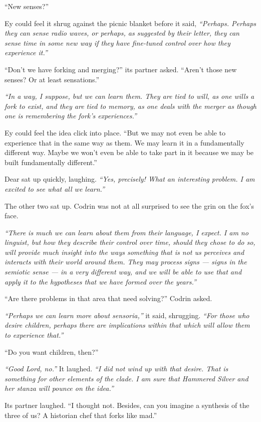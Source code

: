 ``New senses?''

Ey could feel it shrug against the picnic blanket before it said, \emph{``Perhaps. Perhaps they can sense radio waves, or perhaps, as suggested by their letter, they can sense time in some new way if they have fine-tuned control over how they experience it.''}

``Don't we have forking and merging?'' its partner asked. ``Aren't those new senses? Or at least sensations.''

\emph{``In a way, I suppose, but we can learn them. They are tied to will, as one wills a fork to exist, and they are tied to memory, as one deals with the merger as though one is remembering the fork's experiences.''}

Ey could feel the idea click into place. ``But we may not even be able to experience that in the same way as them. We may learn it in a fundamentally different way. Maybe we won't even be able to take part in it because we may be built fundamentally different.''

Dear sat up quickly, laughing. \emph{``Yes, precisely! What an interesting problem. I am excited to see what all we learn.''}

The other two sat up. Codrin was not at all surprised to see the grin on the fox's face.

\emph{``There is much we can learn about them from their language, I expect. I am no linguist, but how they describe their control over time, should they chose to do so, will provide much insight into the ways something that is not us perceives and interacts with their world around them. They may process signs — signs in the semiotic sense — in a very different way, and we will be able to use that and apply it to the hypotheses that we have formed over the years.''}

``Are there problems in that area that need solving?'' Codrin asked.

\emph{``Perhaps we can learn more about sensoria,''} it said, shrugging. \emph{``For those who desire children, perhaps there are implications within that which will allow them to experience that.''}

``Do you want children, then?''

\emph{``Good Lord, no.''} It laughed. \emph{``I did not wind up with that desire. That is something for other elements of the clade. I am sure that Hammered Silver and her stanza will pounce on the idea.''}

Its partner laughed. ``I thought not. Besides, can you imagine a synthesis of the three of us? A historian chef that forks like mad.''

